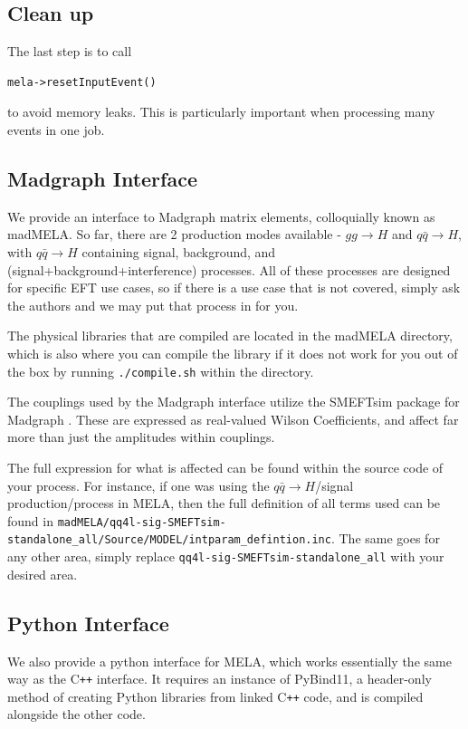 \documentclass[aps,superscriptaddress,nofootinbib]{revtex4}
\begin{document}
\subsection{Clean up}
The last step is to call
\begin{verbatim}
mela->resetInputEvent()
\end{verbatim}
to avoid memory leaks.  This is particularly important when processing many events in one job.

\subsection{Madgraph Interface}
We provide an interface to Madgraph matrix elements, colloquially known as madMELA. So far, there are 2 production modes available - $gg\rightarrow H$ and $q\bar{q}\rightarrow H$, with $q\bar{q}\rightarrow H$ containing signal, background, and (signal+background+interference) processes. All of these processes are designed for specific EFT use cases, so if there is a use case that is not covered, simply ask the authors and we may put that process in for you.

The physical libraries that are compiled are located in the madMELA directory, which is also where you can compile the library if it does not work for you out of the box by running \verb|./compile.sh| within the directory.

The couplings used by the Madgraph interface utilize the SMEFTsim package for Madgraph \cite{SMEFTsim1, SMEFTsim2}. These are expressed as real-valued Wilson Coefficients, and affect far more than just the amplitudes within couplings.

The full expression for what is affected can be found within the source code of your process. For instance, if one was using the $q\bar{q}\rightarrow H$/signal production/process in MELA, then the full definition of all terms used can be found in \verb|madMELA/qq4l-sig-SMEFTsim-standalone_all/Source/MODEL/intparam_defintion.inc|. The same goes for any other area, simply replace \verb|qq4l-sig-SMEFTsim-standalone_all| with your desired area.

\subsection{Python Interface}
We also provide a python interface for MELA, which works essentially the same way as the C\texttt{++} interface. It requires an instance of PyBind11, a header-only method of creating Python libraries from linked C\texttt{++} code, and is compiled alongside the other code.
\end{document}
